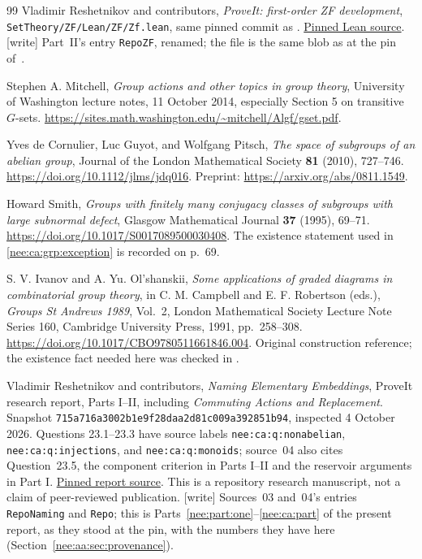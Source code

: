 \documentclass[11pt,letterpaper]{article}
\numberwithin{equation}{section}
\theoremstyle{plain}
\theoremstyle{definition}
\theoremstyle{remark}
\begin{document}
\begin{thebibliography}{99}
Vladimir Reshetnikov and contributors,
\emph{ProveIt: first-order ZF development},
\nolinkurl{SetTheory/ZF/Lean/ZF/Zf.lean},
same pinned commit as \cite{RepoNaming}.
\href{https://github.com/VladimirReshetnikov/ProveIt/blob/a9ab9a69872c2fb7464097af32fd7b76c75cb030/SetTheory/ZF/Lean/ZF/Zf.lean}{Pinned Lean source}.
[write] Part~II's entry \texttt{RepoZF}, renamed; the file is the same blob as at the pin of~\cite{RepoZF}.

Stephen A. Mitchell,
\emph{Group actions and other topics in group theory},
University of Washington lecture notes, 11 October 2014,
especially Section 5 on transitive $G$-sets.
\url{https://sites.math.washington.edu/~mitchell/Algf/gset.pdf}.

Yves de Cornulier, Luc Guyot, and Wolfgang Pitsch,
\emph{The space of subgroups of an abelian group},
Journal of the London Mathematical Society \textbf{81} (2010), 727--746.
\url{https://doi.org/10.1112/jlms/jdq016}.
Preprint: \url{https://arxiv.org/abs/0811.1549}.

Howard Smith,
\emph{Groups with finitely many conjugacy classes of subgroups with large subnormal defect},
Glasgow Mathematical Journal \textbf{37} (1995), 69--71.
\url{https://doi.org/10.1017/S0017089500030408}.
The existence statement used in \cref{nee:ca:grp:exception} is recorded on p.~69.

S. V. Ivanov and A. Yu. Ol'shanskii,
\emph{Some applications of graded diagrams in combinatorial group theory},
in C. M. Campbell and E. F. Robertson (eds.),
\emph{Groups St Andrews 1989}, Vol.~2,
London Mathematical Society Lecture Note Series 160,
Cambridge University Press, 1991, pp.~258--308.
\url{https://doi.org/10.1017/CBO9780511661846.004}.
Original construction reference; the existence fact needed here was checked in \cite{Smith1995}.

Vladimir Reshetnikov and contributors,
\emph{Naming Elementary Embeddings}, ProveIt research report, Parts I--II,
including \emph{Commuting Actions and Replacement}.
Snapshot \texttt{715a716a3002b1e9f28daa2d81c009a392851b94}, inspected
4 October 2026. Questions 23.1--23.3 have source labels
\texttt{nee:ca:q:nonabelian}, \texttt{nee:ca:q:injections}, and
\texttt{nee:ca:q:monoids}; source~04 also cites Question~23.5, the component criterion in Parts I--II and the reservoir arguments in Part I.
\href{https://github.com/VladimirReshetnikov/ProveIt/blob/715a716a3002b1e9f28daa2d81c009a392851b94/SetTheory/Cardinals/docs/reports/ordinals-and-order-types/naming-elementary-embeddings/article.tex}{Pinned report source}.
This is a repository research manuscript, not a claim of peer-reviewed publication.
[write] Sources~03 and~04's entries \texttt{RepoNaming} and \texttt{Repo}; this is Parts~\ref{nee:part:one}--\ref{nee:ca:part} of the present report, as they stood at the pin, with the numbers they have here (Section~\ref{nee:aa:sec:provenance}).


\end{thebibliography}
\end{document}
